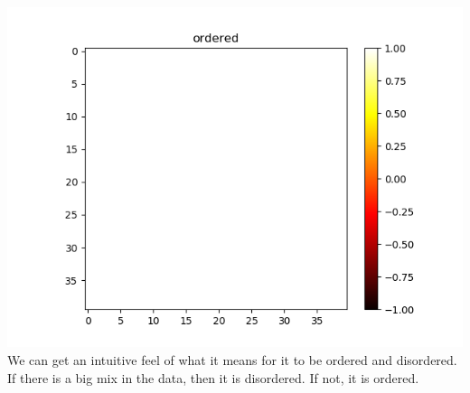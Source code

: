 \documentclass[a4paper,norsk]{article}
\begin{document}
\includegraphics[scale=.7]{images/orderedv2}\\
We can get an intuitive feel of what it means for it to be ordered and disordered. If there is a big mix in the data, then it is disordered. If not, it is ordered.
\end{document}
